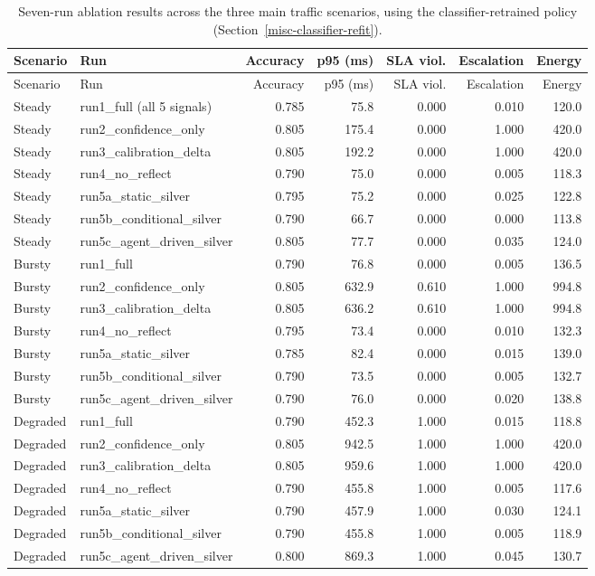 \begin{longtable}{llrrrrr}
\caption{Seven-run ablation results across the three main traffic scenarios, using the classifier-retrained policy (Section~\ref{misc-classifier-refit}).}\label{tab:ablation-results}\\
\toprule
Scenario & Run & Accuracy & p95 (ms) & SLA viol. & Escalation & Energy \\
\midrule
\endfirsthead
\toprule
Scenario & Run & Accuracy & p95 (ms) & SLA viol. & Escalation & Energy \\
\midrule
\endhead
Steady & run1\_full (all 5 signals) & 0.785 & 75.8 & 0.000 & 0.010 & 120.0 \\
Steady & run2\_confidence\_only & 0.805 & 175.4 & 0.000 & 1.000 & 420.0 \\
Steady & run3\_calibration\_delta & 0.805 & 192.2 & 0.000 & 1.000 & 420.0 \\
Steady & run4\_no\_reflect & 0.790 & 75.0 & 0.000 & 0.005 & 118.3 \\
Steady & run5a\_static\_silver & 0.795 & 75.2 & 0.000 & 0.025 & 122.8 \\
Steady & run5b\_conditional\_silver & 0.790 & 66.7 & 0.000 & 0.000 & 113.8 \\
Steady & run5c\_agent\_driven\_silver & 0.805 & 77.7 & 0.000 & 0.035 & 124.0 \\
\addlinespace
Bursty & run1\_full & 0.790 & 76.8 & 0.000 & 0.005 & 136.5 \\
Bursty & run2\_confidence\_only & 0.805 & 632.9 & 0.610 & 1.000 & 994.8 \\
Bursty & run3\_calibration\_delta & 0.805 & 636.2 & 0.610 & 1.000 & 994.8 \\
Bursty & run4\_no\_reflect & 0.795 & 73.4 & 0.000 & 0.010 & 132.3 \\
Bursty & run5a\_static\_silver & 0.785 & 82.4 & 0.000 & 0.015 & 139.0 \\
Bursty & run5b\_conditional\_silver & 0.790 & 73.5 & 0.000 & 0.005 & 132.7 \\
Bursty & run5c\_agent\_driven\_silver & 0.790 & 76.0 & 0.000 & 0.020 & 138.8 \\
\addlinespace
Degraded & run1\_full & 0.790 & 452.3 & 1.000 & 0.015 & 118.8 \\
Degraded & run2\_confidence\_only & 0.805 & 942.5 & 1.000 & 1.000 & 420.0 \\
Degraded & run3\_calibration\_delta & 0.805 & 959.6 & 1.000 & 1.000 & 420.0 \\
Degraded & run4\_no\_reflect & 0.790 & 455.8 & 1.000 & 0.005 & 117.6 \\
Degraded & run5a\_static\_silver & 0.790 & 457.9 & 1.000 & 0.030 & 124.1 \\
Degraded & run5b\_conditional\_silver & 0.790 & 455.8 & 1.000 & 0.005 & 118.9 \\
Degraded & run5c\_agent\_driven\_silver & 0.800 & 869.3 & 1.000 & 0.045 & 130.7 \\
\bottomrule
\end{longtable}

